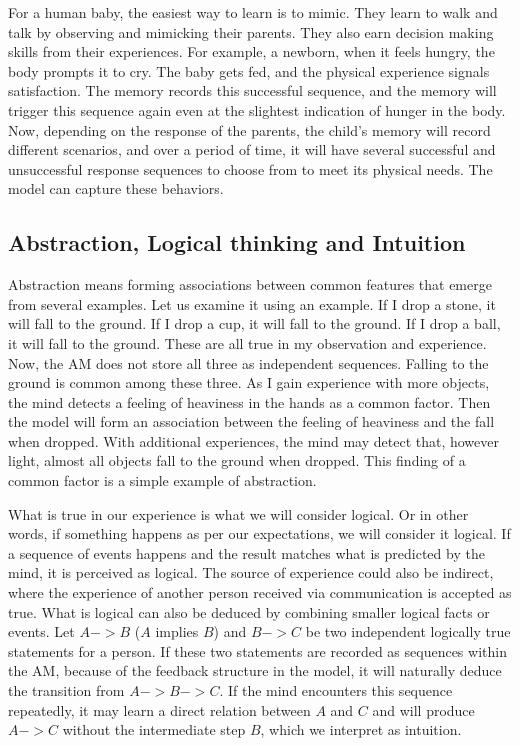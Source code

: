 \documentclass[reprint,amsmath,amssymb,apr,aip,onecolumn, 11pt]{revtex4-1}
\begin{document}
For a human baby, the easiest way to learn is to mimic. They learn to walk and talk by observing and mimicking their parents. They also earn decision making skills from their experiences. For example, a newborn, when it feels hungry, the body prompts it to cry. The baby gets fed, and the physical experience signals satisfaction. The memory records this successful sequence, and the memory will trigger this sequence again even at the slightest indication of hunger in the body.  Now, depending on the response of the parents, the child's memory will record different scenarios, and over a period of time, it will have several successful and unsuccessful response sequences to choose from to meet its physical needs. The model can capture these behaviors. 


\subsection{Abstraction, Logical thinking and Intuition \label{sec:abs_intuition}}

 Abstraction means forming associations between common features that emerge from several examples. Let us examine it using an example. If I drop a stone, it will fall to the ground. If I drop a cup, it will fall to the ground. If I drop a ball, it will fall to the ground. These are all true in my observation and experience. Now, the AM does not store all three as independent sequences. Falling to the ground is common among these three. As I gain experience with more objects, the mind detects a feeling of heaviness in the hands as a common factor. Then the model will form an association between the feeling of heaviness and the fall when dropped. With additional experiences, the mind may detect that, however light, almost all objects fall to the ground when dropped. This finding of a common factor is a simple example of abstraction. 
 
 What is true in our experience is what we will consider logical. Or in other words, if something happens as per our expectations, we will consider it logical. If a sequence of events happens and the result matches what is predicted by the mind, it is perceived as logical. The source of experience could also be indirect, where the experience of another person received via communication is accepted as true. What is logical can also be deduced by combining smaller logical facts or events.  Let $A->B$ ($A$ implies $B$) and $B->C$ be two independent logically true statements for a person. If these two statements are recorded as sequences within the AM, because of the feedback structure in the model, it will naturally deduce the transition from  $A->B->C$.  If the mind encounters this sequence repeatedly, it may learn a direct relation between $A$ and $C$ and will produce $A->C$ without the intermediate step $B$, which we interpret as intuition. 
 
\end{document}
